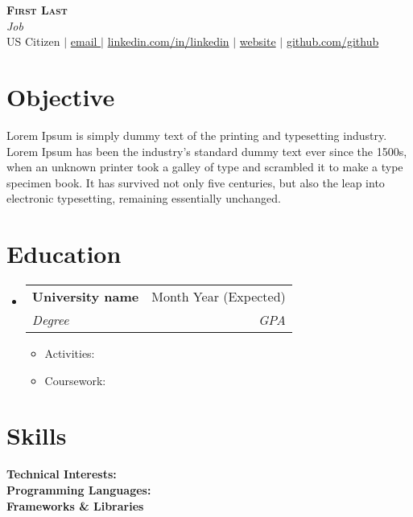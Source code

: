 \documentclass[letterpaper,10pt]{article}
\makeatletter
\def\sectionSpacing{-14pt}
\newcommand{\educationItem}[1]{
  \item\footnotesize{
    {#1 \vspace{-2pt}}
  }
}
\newcommand{\educationHeading}[4]{
  \vspace{-2pt}\item
    \begin{tabular*}{0.97\textwidth}[t]{l@{\extracolsep{\fill}}r}
      \textbf{#1} & #2 \\
      \textit{\small#3} & \textit{\small #4} \\
    \end{tabular*}\vspace{-7pt}
}
\newcommand{\resumeSubHeadingListStart}{\begin{itemize}[leftmargin=0.15in, label={}]}
\newcommand{\resumeSubHeadingListEnd}{\end{itemize}}
\newcommand{\resumeItemListStart}{\begin{itemize}}
\newcommand{\resumeItemListEnd}{\end{itemize}\vspace{-5pt}}
\newcommand{\status}[1]{#1}
\newcommand{\phone}[1]{#1}
\newcommand{\mail}[1]{\href{mailto:#1}{#1}}
\newcommand{\linkedin}[1]{\href{https://www.linkedin.com/in/#1/}{linkedin.com/in/#1}}
\newcommand{\website}[1]{\href{https://#1}{#1}}
\newcommand{\github}[1]{\href{https://github.com/#1}{github.com/#1}}
\makeatother
\begin{document}

\begin{center}
    \textbf{\Huge \scshape First Last} \\ \vspace{4pt}
    \footnotesize{\textit{Job}}\\ \vspace{4pt}
    \scriptsize
    {
    \status{US Citizen} $ | $ 
    \mail{ email }$ | $ 
    \linkedin{linkedin} $ | $
    \website{website} $ | $
    \github{github}
    }
\end{center}

\section{Objective}
\small{
Lorem Ipsum is simply dummy text of the printing and typesetting industry. Lorem Ipsum has been the industry's standard dummy text ever since the 1500s, when an unknown printer took a galley of type and scrambled it to make a type specimen book. It has survived not only five centuries, but also the leap into electronic typesetting, remaining essentially unchanged.
}

\vspace{-8pt}
\section{Education}
  \resumeSubHeadingListStart
    \educationHeading
      {\small University name}{\small Month Year (Expected)}
      {\footnotesize{Degree}}{\footnotesize{GPA}}
      {
        \resumeItemListStart[leftmargin=1em]
        \educationItem{Activities: }
        \educationItem {Coursework: }
        \resumeItemListEnd
      }
  \resumeSubHeadingListEnd
\vspace{\sectionSpacing}
\section{Skills}
 \begin{itemize}[leftmargin=0.15in, label={}]
    \footnotesize{\item{

     \textbf{Technical Interests:}{}\\
     \textbf{Programming Languages:}{}\\
     \textbf{Frameworks \& Libraries}{}\\
    }} 
 \end{itemize}
 
\end{document}
